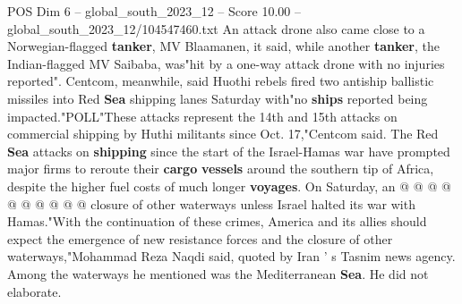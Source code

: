 \begin{textsample}{POS Dim 6 – global\_south\_2023\_12 – Score 10.00 – global\_south\_2023\_12/104547460.txt}
An attack drone also came close to a Norwegian-flagged \textbf{tanker}, MV Blaamanen, it said, while another \textbf{tanker}, the Indian-flagged MV Saibaba, was"hit by a one-way attack drone with no injuries reported".
Centcom, meanwhile, said Huothi rebels fired two antiship ballistic missiles into Red \textbf{Sea} shipping lanes Saturday with"no \textbf{ships} reported being impacted."POLL"These attacks represent the 14th and 15th attacks on commercial shipping by Huthi militants since Oct. 17,"Centcom said.
The Red \textbf{Sea} attacks on \textbf{shipping} since the start of the Israel-Hamas war have prompted major firms to reroute their \textbf{cargo} \textbf{vessels} around the southern tip of Africa, despite the higher fuel costs of much longer \textbf{voyages}.
On Saturday, an @ @ @ @ @ @ @ @ @ @ closure of other waterways unless Israel halted its war with Hamas."With the continuation of these crimes, America and its allies should expect the emergence of new resistance forces and the closure of other waterways,"Mohammad Reza Naqdi said, quoted by Iran ' s Tasnim news agency.
Among the waterways he mentioned was the Mediterranean \textbf{Sea}.
He did not elaborate.

\end{textsample}
